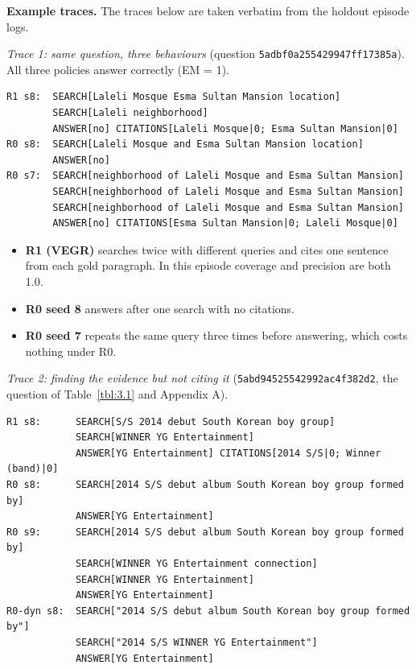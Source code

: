 \textbf{Example traces.} The traces below are taken verbatim from the
holdout episode logs.

\emph{Trace 1: same question, three behaviours} (question
\texttt{5adb\allowbreak{}f0a2\allowbreak{}5542\allowbreak{}9947\allowbreak{}ff17\allowbreak{}385a\allowbreak{}}).
All three policies answer correctly (EM = 1).

\begin{Verbatim}
R1 s8:  SEARCH[Laleli Mosque Esma Sultan Mansion location]
        SEARCH[Laleli neighborhood]
        ANSWER[no] CITATIONS[Laleli Mosque|0; Esma Sultan Mansion|0]
R0 s8:  SEARCH[Laleli Mosque and Esma Sultan Mansion location]
        ANSWER[no]
R0 s7:  SEARCH[neighborhood of Laleli Mosque and Esma Sultan Mansion]
        SEARCH[neighborhood of Laleli Mosque and Esma Sultan Mansion]
        SEARCH[neighborhood of Laleli Mosque and Esma Sultan Mansion]
        ANSWER[no] CITATIONS[Esma Sultan Mansion|0; Laleli Mosque|0]
\end{Verbatim}

\begin{itemize}
\tightlist
\item
  \textbf{R1 (VEGR)} searches twice with different queries and cites one
  sentence from each gold paragraph. In this episode coverage and
  precision are both 1.0.
\item
  \textbf{R0 seed 8} answers after one search with no citations.
\item
  \textbf{R0 seed 7} repeats the same query three times before
  answering, which costs nothing under R0.
\end{itemize}

\emph{Trace 2: finding the evidence but not citing it}
(\texttt{5abd\allowbreak{}9452\allowbreak{}5542\allowbreak{}992a\allowbreak{}c4f3\allowbreak{}82d2\allowbreak{}},
the question of Table~\ref{tbl:3.1} and Appendix A).

\begin{Verbatim}
R1 s8:      SEARCH[S/S 2014 debut South Korean boy group]
            SEARCH[WINNER YG Entertainment]
            ANSWER[YG Entertainment] CITATIONS[2014 S/S|0; Winner (band)|0]
R0 s8:      SEARCH[2014 S/S debut album South Korean boy group formed by]
            ANSWER[YG Entertainment]
R0 s9:      SEARCH[2014 S/S debut album South Korean boy group formed by]
            SEARCH[WINNER YG Entertainment connection]
            SEARCH[WINNER YG Entertainment]
            ANSWER[YG Entertainment]
R0-dyn s8:  SEARCH["2014 S/S debut album South Korean boy group formed by"]
            SEARCH["2014 S/S WINNER YG Entertainment"]
            ANSWER[YG Entertainment]
\end{Verbatim}

